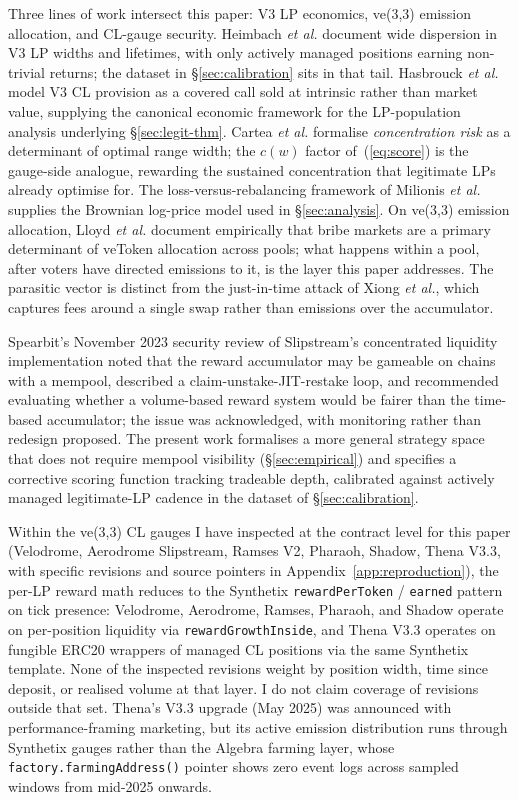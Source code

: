 \documentclass[11pt,a4paper]{article}
\theoremstyle{definition}
\theoremstyle{plain}
\theoremstyle{remark}
\begin{document}
Three lines of work intersect this paper: V3 LP economics, ve(3,3) emission allocation, and CL-gauge security. Heimbach \emph{et al.}\cite{heimbach2022} document wide dispersion in V3 LP widths and lifetimes, with only actively managed positions earning non-trivial returns; the dataset in \S\ref{sec:calibration} sits in that tail. Hasbrouck \emph{et al.}\cite{hasbrouck2025} model V3 CL provision as a covered call sold at intrinsic rather than market value, supplying the canonical economic framework for the LP-population analysis underlying \S\ref{sec:legit-thm}. Cartea \emph{et al.}\cite{cartea2024} formalise \emph{concentration risk} as a determinant of optimal range width; the $c(w)$ factor of~(\ref{eq:score}) is the gauge-side analogue, rewarding the sustained concentration that legitimate LPs already optimise for. The loss-versus-rebalancing framework of Milionis \emph{et al.}\cite{milionis2022b} supplies the Brownian log-price model used in \S\ref{sec:analysis}. On ve(3,3) emission allocation, Lloyd \emph{et al.}\cite{lloyd2023} document empirically that bribe markets are a primary determinant of veToken allocation across pools; what happens within a pool, after voters have directed emissions to it, is the layer this paper addresses. The parasitic vector is distinct from the just-in-time attack of Xiong \emph{et al.}\cite{xiong2023}, which captures fees around a single swap rather than emissions over the accumulator.

Spearbit's November 2023 security review of Slipstream's concentrated liquidity implementation\cite{spearbit2023} noted that the reward accumulator may be gameable on chains with a mempool, described a claim-unstake-JIT-restake loop, and recommended evaluating whether a volume-based reward system would be fairer than the time-based accumulator; the issue was acknowledged, with monitoring rather than redesign proposed. The present work formalises a more general strategy space that does not require mempool visibility (\S\ref{sec:empirical}) and specifies a corrective scoring function tracking tradeable depth, calibrated against actively managed legitimate-LP cadence in the dataset of \S\ref{sec:calibration}.

Within the ve(3,3) CL gauges I have inspected at the contract level for this paper (Velodrome, Aerodrome Slipstream, Ramses V2, Pharaoh, Shadow, Thena V3.3, with specific revisions and source pointers in Appendix~\ref{app:reproduction}), the per-LP reward math reduces to the Synthetix \texttt{rewardPerToken} / \texttt{earned} pattern on tick presence: Velodrome, Aerodrome, Ramses, Pharaoh, and Shadow operate on per-position liquidity via \texttt{rewardGrowthInside}, and Thena V3.3 operates on fungible ERC20 wrappers of managed CL positions via the same Synthetix template. None of the inspected revisions weight by position width, time since deposit, or realised volume at that layer. I do not claim coverage of revisions outside that set. Thena's V3.3 upgrade (May 2025) was announced with performance-framing marketing, but its active emission distribution runs through Synthetix gauges rather than the Algebra farming layer, whose \texttt{factory.farmingAddress()} pointer shows zero event logs across sampled windows from mid-2025 onwards.
\end{document}
